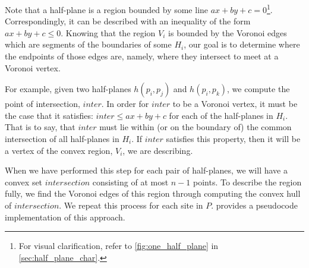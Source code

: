 \documentclass[12pt,twoside]{reedthesis}
\begin{document}
    Note that a half-plane is a region bounded by some line $ax + by + c = 0$\footnote{For visual clarification, refer to \cref{fig:one_half_plane} in \cref{sec:half_plane_char}.}. Correspondingly, it can be described with an inequality of the form $ax + by + c \leq 0$. Knowing that the region $V_{i}$ is bounded by the Voronoi edges which are segments of the boundaries of some $H_{i}$, our goal is to determine where the endpoints of those edges are, namely, where they intersect to meet at a Voronoi vertex. 

    For example, given two half-planes $h(p_{i}, p_{j})$ and $h(p_{i}, p_{k})$, we compute the point of intersection, $inter$. In order for $inter$ to be a Voronoi vertex, it must be the case that it satisfies: $inter \leq ax + by + c$ for each of the half-planes in $H_{i}$. That is to say, that $inter$ must lie within (or on the boundary of) the common intersection of all half-planes in $H_{i}$. If $inter$ satisfies this property, then it will be a vertex of the convex region, $V_{i}$, we are describing. \par

    When we have performed this step for each pair of half-planes, we will have a convex set $\textit{intersection}$ consisting of at most $n-1$ points. To describe the region fully, we find the Voronoi edges of this region through computing the convex hull of $\textit{intersection}$. We repeat this process for each site in $P$.  provides a pseudocode implementation of this approach.\par
\end{document}
